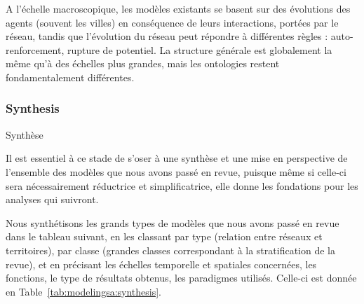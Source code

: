A l'échelle macroscopique, les modèles existants se basent sur des évolutions des agents (souvent les villes)  en conséquence de leurs interactions, portées par le réseau, tandis que l'évolution du réseau peut répondre à différentes règles : auto-renforcement, rupture de potentiel. La structure générale est globalement la même qu'à des échelles plus grandes, mais les ontologies restent fondamentalement différentes.





\subsubsection*{Synthesis}{Synthèse}


Il est essentiel à ce stade de s'oser à une synthèse et une mise en perspective de l'ensemble des modèles que nous avons passé en revue, puisque même si celle-ci sera nécessairement réductrice et simplificatrice, elle donne les fondations pour les analyses qui suivront.




Nous synthétisons les grands types de modèles que nous avons passé en revue dans le tableau suivant, en les classant par type (relation entre réseaux et territoires), par classe (grandes classes correspondant à la stratification de la revue), et en précisant les échelles temporelle et spatiales concernées, les fonctions, le type de résultats obtenus, les paradigmes utilisés. Celle-ci est donnée en Table~\ref{tab:modelingsa:synthesis}.

